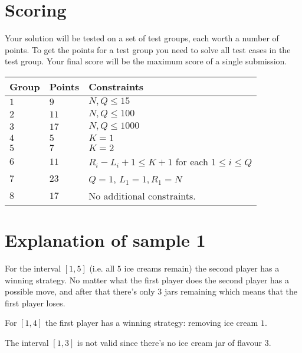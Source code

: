 \section*{Scoring}
Your solution will be tested on a set of test groups, each worth a number of points.
To get the points for a test group you need to solve all test cases in the test group. Your final score will be the maximum score of a single submission.

\noindent
\begin{tabular}{| l | l | p{12cm} |}
  \hline
  Group & Points & Constraints \\ \hline
  $1$     & $9$          &  $N,Q \le 15$ \\ \hline
  $2$     & $11$         &  $N,Q \le 100$  \\ \hline
  $3$     & $17$         &  $N,Q \le 1000$  \\ \hline
  $4$     & $5$          &  $K=1$  \\ \hline
  $5$     & $7$          &  $K=2$  \\ \hline
  $6$     & $11$         &  $R_i - L_i + 1 \le K+1$ for each $1 \le i \le Q$  \\ \hline
  $7$     & $23$         &  $Q=1$, $L_1=1, R_1=N$ \\ \hline
  $8$     & $17$         &  No additional constraints. \\ \hline
\end{tabular}

\section*{Explanation of sample 1}
For the interval $[1, 5]$ (i.e. all $5$ ice creams remain) the second player has a winning strategy.
No matter what the first player does the second player has a possible move, and after that there's only $3$ jars remaining which means that the first player loses.

For $[1, 4]$ the first player has a winning strategy: removing ice cream $1$.

The interval $[1, 3]$ is not valid since there's no ice cream jar of flavour $3$.
